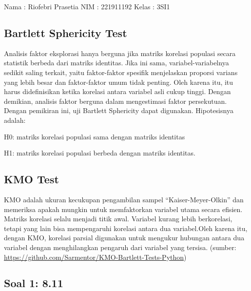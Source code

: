 \documentclass[
]{article}
\author{}
\date{\vspace{-2.5em}}
\begin{document}
Nama : Riofebri Prasetia NIM : 221911192 Kelas : 3SI1

\hypertarget{bartlett-sphericity-test}{%
\subsection{Bartlett Sphericity Test}\label{bartlett-sphericity-test}}

Analisis faktor eksplorasi hanya berguna jika matriks korelasi populasi
secara statistik berbeda dari matriks identitas. Jika ini sama,
variabel-variabelnya sedikit saling terkait, yaitu faktor-faktor
spesifik menjelaskan proporsi varians yang lebih besar dan faktor-faktor
umum tidak penting. Oleh karena itu, itu harus didefinisikan ketika
korelasi antara variabel asli cukup tinggi. Dengan demikian, analisis
faktor berguna dalam mengestimasi faktor persekutuan. Dengan pemikiran
ini, uji Bartlett Sphericity dapat digunakan. Hipotesisnya adalah:

H0: matriks korelasi populasi sama dengan matriks identitas

H1: matriks korelasi populasi berbeda dengan matriks identitas.

\hypertarget{kmo-test}{%
\subsection{KMO Test}\label{kmo-test}}

KMO adalah ukuran kecukupan pengambilan sampel ``Kaiser-Meyer-Olkin''
dan memeriksa apakah mungkin untuk memfaktorkan variabel utama secara
efisien. Matriks korelasi selalu menjadi titik awal. Variabel kurang
lebih berkorelasi, tetapi yang lain bisa mempengaruhi korelasi antara
dua variabel.Oleh karena itu, dengan KMO, korelasi parsial digunakan
untuk mengukur hubungan antara dua variabel dengan menghilangkan
pengaruh dari variabel yang tersisa. (sumber:
\url{https://github.com/Sarmentor/KMO-Bartlett-Tests-Python})

\hypertarget{soal-1-8.11}{%
\subsection{Soal 1: 8.11}\label{soal-1-8.11}}
\end{document}
